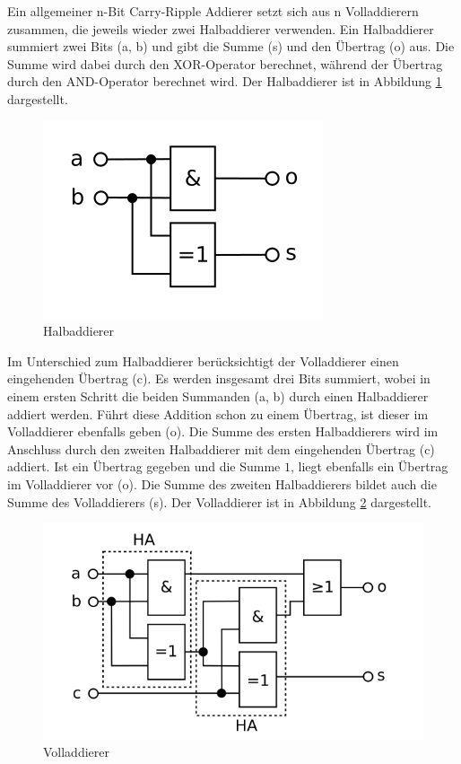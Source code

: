 Ein allgemeiner n-Bit Carry-Ripple Addierer setzt sich aus n Volladdierern zusammen, die jeweils wieder zwei Halbaddierer verwenden. Ein Halbaddierer summiert zwei
Bits (a, b) und gibt die Summe (s) und den Übertrag (o) aus. Die Summe wird dabei durch den XOR-Operator berechnet, während der Übertrag durch den AND-Operator
berechnet wird. Der Halbaddierer ist in Abbildung \ref{fig:halfadder} dargestellt.
\begin{figure}[!h]
  \centering
  \includegraphics[scale=1]{images/halfadder}
  \caption[Halbaddierer]{Halbaddierer\protect\footnotemark}
  \label{fig:halfadder}
\end{figure}

Im Unterschied zum Halbaddierer berücksichtigt der Volladdierer einen eingehenden Übertrag (c). Es werden insgesamt drei Bits summiert, wobei in einem ersten Schritt
die beiden Summanden (a, b) durch einen Halbaddierer addiert werden. Führt diese Addition schon zu einem Übertrag, ist dieser im Volladdierer ebenfalls geben (o).
Die Summe des ersten Halbaddierers wird im Anschluss durch den zweiten Halbaddierer mit dem eingehenden Übertrag (c) addiert. Ist ein Übertrag gegeben und die
Summe $1$, liegt ebenfalls ein Übertrag im Volladdierer vor (o). Die Summe des zweiten Halbaddierers bildet auch die Summe des Volladdierers (s). Der Volladdierer
ist in Abbildung \ref{fig:fulladder} dargestellt.
\begin{figure}[!h]
  \centering
  \includegraphics[scale=1]{images/fulladder}
  \caption[Volladdierer]{Volladdierer\protect\footnotemark}
  \label{fig:fulladder}
\end{figure}

